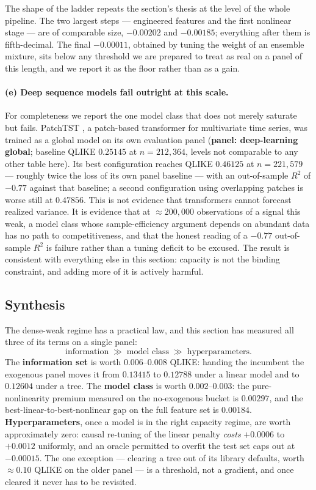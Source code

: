 The shape of the ladder repeats the section's thesis at the level of the whole
pipeline. The two largest steps --- engineered features and the first nonlinear
stage --- are of comparable size, $-0.00202$ and $-0.00185$; everything after them
is fifth-decimal. The final $-0.00011$, obtained by tuning the weight of an
ensemble mixture, sits below any threshold we are prepared to treat as real on a
panel of this length, and we report it as the floor rather than as a gain.

\paragraph{(e) Deep sequence models fail outright at this scale.}
For completeness we report the one model class that does not merely saturate but
fails. PatchTST \citep{Nie2023}, a patch-based transformer for multivariate time
series, was trained as a global model on its own evaluation panel
(\textbf{panel: deep-learning global}; baseline QLIKE $0.25145$ at
$n = 212{,}364$, levels not comparable to any other table here). Its best
configuration reaches QLIKE $0.46125$ at $n = 221{,}579$ --- roughly twice the
loss of its own panel baseline --- with an out-of-sample $R^2$ of $-0.77$ against
that baseline; a second configuration using overlapping patches is worse still at
$0.47856$. This is not evidence that transformers cannot forecast realized
variance. It is evidence that at $\approx 200{,}000$ observations of a signal
this weak, a model class whose sample-efficiency argument depends on abundant
data has no path to competitiveness, and that the honest reading of a $-0.77$
out-of-sample $R^2$ is failure rather than a tuning deficit to be excused. The
result is consistent with everything else in this section: capacity is not the
binding constraint, and adding more of it is actively harmful.

\subsection{Synthesis}
\label{sec:linvsnonlin_synthesis}

The dense-weak regime has a practical law, and this section has measured all
three of its terms on a single panel:
\[
\text{information} \;\gg\; \text{model class} \;\gg\; \text{hyperparameters}.
\]
The \textbf{information set} is worth $0.006$--$0.008$ QLIKE: handing the
incumbent the exogenous panel moves it from $0.13415$ to $0.12788$ under a linear
model and to $0.12604$ under a tree. The \textbf{model class} is worth
$0.002$--$0.003$: the pure-nonlinearity premium measured on the no-exogenous
bucket is $0.00297$, and the best-linear-to-best-nonlinear gap on the full
feature set is $0.00184$. \textbf{Hyperparameters}, once a model is in the right
capacity regime, are worth approximately zero: causal re-tuning of the linear
penalty \emph{costs} $+0.0006$ to $+0.0012$ uniformly, and an oracle permitted to
overfit the test set caps out at $-0.00015$. The one exception --- clearing a
tree out of its library defaults, worth $\approx 0.10$ QLIKE on the older panel
--- is a threshold, not a gradient, and once cleared it never has to be revisited.

